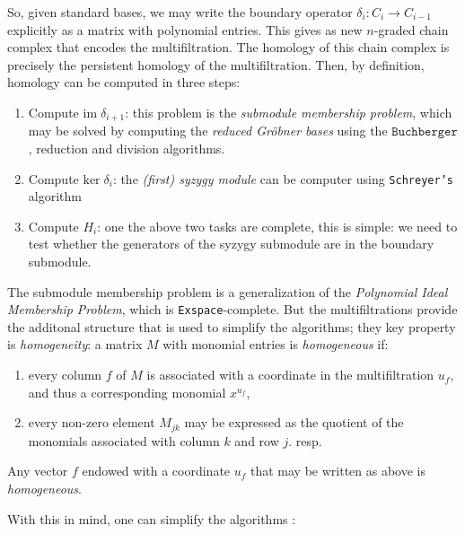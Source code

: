 \documentclass[a4paper,8pt,epsfig]{article}
\begin{document}
 	 So, given standard bases, we may write the boundary operator $\delta_i: C_i \to C_{i-1}$ explicitly as a matrix with polynomial entries. This gives as new $n$-graded chain complex that encodes the multifiltration. The homology of this chain complex is precisely the persistent homology of the multifiltration. Then, by definition, homology can be computed in three steps:
 	 \begin{enumerate}
 	 	\item Compute $\mathrm{im}\; \delta_{i+1}$: this problem is the {\it submodule membership problem}, which may be solved by computing the {\it reduced Gröbner bases} using the $\texttt{Buchberger}$, reduction and division algorithms.
 	 	\item Compute $\mathrm{ker}\; \delta_i$: the {\it (first) syzygy module} can be computer using \texttt{Schreyer's} algorithm
 	 	\item Compute $H_i$: one the above two tasks are complete, this is simple: we need to test whether the generators of the syzygy submodule are in the boundary submodule.
 	 \end{enumerate}
 	 
 	 The submodule membership problem is a generalization of the {\it Polynomial Ideal Membership Problem}, which is \texttt{Exspace}-complete. But the multifiltrations provide the additonal structure that is used to simplify the algorithms; they key property is {\it homogeneity}: a matrix $M$ with monomial entries is {\it homogeneous} if:
 	 \begin{enumerate}
 	 	\item every column $f$ of $M$ is associated with a coordinate in the multifiltration $u_f$, and thus a corresponding monomial $x^{u_f}$,
 	 	\item every non-zero element $M_{jk}$ may be expressed as the quotient of the monomials associated with column $k$ and row $j$. resp.
 	 \end{enumerate}
  	Any vector $f$ endowed with a coordinate $u_f$ that may be written as above is {\it homogeneous}.
  	
  	With this in mind, one can simplify the algorithms \cite{compmulpers}:
  	
\end{document}

